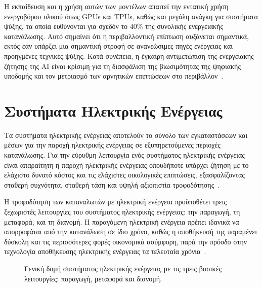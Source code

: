 Η εκπαίδευση και η χρήση αυτών των μοντέλων απαιτεί την εντατική χρήση ενεργοβόρου υλικού όπως GPUs και TPUs, καθώς και μεγάλη ανάγκη για συστήματα ψύξης, τα οποία ευθύνονται για σχεδόν το 40\% της συνολικής ενεργειακής κατανάλωσης. Αυτό σημαίνει ότι η περιβαλλοντική επίπτωση αυξάνεται σημαντικά, εκτός εάν υπάρξει μια σημαντική στροφή σε ανανεώσιμες πηγές ενέργειας και προηγμένες τεχνικές ψύξης. Κατά συνέπεια, η έγκαιρη αντιμετώπιση της ενεργειακής ζήτησης της AI είναι κρίσιμη για τη διασφάλιση της βιωσιμότητας της ψηφιακής υποδομής και τον μετριασμό των αρνητικών επιπτώσεων στο περιβάλλον~\cite{chauhan2024}.


\section{Συστήματα Ηλεκτρικής Ενέργειας}
\label{sec:power-systems}

Τα συστήματα ηλεκτρικής ενέργειας αποτελούν το σύνολο των εγκαταστάσεων και μέσων για την παροχή ηλεκτρικής ενέργειας σε εξυπηρετούμενες περιοχές κατανάλωσης. Για την εύρυθμη λειτουργία ενός συστήματος ηλεκτρικής ενέργειας είναι απαραίτητη η παροχή ηλεκτρικής ενέργειας οπουδήποτε υπάρχει ζήτηση με το ελάχιστο δυνατό κόστος και τις ελάχιστες οικολογικές επιπτώσεις, εξασφαλίζοντας σταθερή συχνότητα, σταθερή τάση και υψηλή αξιοπιστία τροφοδότησης~\cite{vournas-kontaxis}.

Η τροφοδότηση των καταναλωτών με ηλεκτρική ενέργεια προϋποθέτει τρεις ξεχωριστές λειτουργίες του συστήματος ηλεκτρικής ενέργειας: την παραγωγή, τη μεταφορά, και τη διανομή. Η παραγόμενη ηλεκτρική ενέργεια πρέπει ιδανικά να απορροφάται από την κατανάλωση σε ίδιο χρόνο, καθώς η αποθήκευσή της παραμένει δύσκολη και τις περισσότερες φορές οικονομικά ασύμφορη, παρά την πρόοδο στην τεχνολογία αποθήκευσης ηλεκτρικής ενέργειας τα τελευταία χρόνια~\cite{hiesl2020}.

\begin{figure}[htbp]
\centering
\caption{Γενική δομή συστήματος ηλεκτρικής ενέργειας με τις τρεις βασικές λειτουργίες: παραγωγή, μεταφορά και διανομή.}
\label{fig:power-system-overview}
\end{figure}

